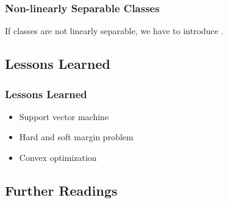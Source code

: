 \begin{frame}
  \frametitle{Non-linearly Separable Classes}

  If classes are not linearly separable, we have to introduce . \\[1cm] \pause
  
  
  \begin{center}
  \end{center}
\end{frame}


\subsection{Lessons Learned}

\begin{frame}
  \frametitle{Lessons Learned}

  \begin{itemize}
    \item Support vector machine \\[.5cm]
    \item Hard and soft margin problem \\[.5cm]
    \item Convex optimization 
  \end{itemize}
\end{frame}



\subsection{Further Readings}

